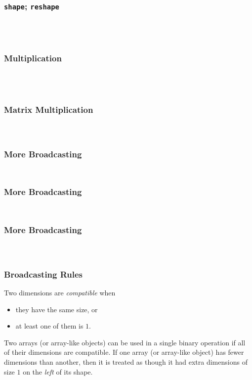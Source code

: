 \documentclass{beamer}
\begin{document}
\begin{frame}[fragile]
  \frametitle{\texttt{shape}; \texttt{reshape}}
  \inputminted[firstline=1,lastline=2]{pycon}{code/shape.txt}
  \codepause
  \inputminted[firstline=3,lastline=4]{pycon}{code/shape.txt}
  \codepause
  \inputminted[firstline=5,lastline=9]{pycon}{code/shape.txt}
  \codepause
  \inputminted[firstline=10,lastline=11]{pycon}{code/shape.txt}
\end{frame}

\begin{frame}[fragile]
  \frametitle{Multiplication}
  \inputminted[firstline=1,lastline=3]{pycon}{code/matmul.txt}
  \codepause
  \inputminted[firstline=4,lastline=6]{pycon}{code/matmul.txt}
  \codepause
  \inputminted[firstline=7,lastline=7]{pycon}{code/matmul.txt}
  \codepause
  \inputminted[firstline=8,lastline=9]{pycon}{code/matmul.txt}
\end{frame}

\begin{frame}[fragile]
  \frametitle{Matrix Multiplication}
  \inputminted[firstline=10,lastline=12]{pycon}{code/matmul.txt}
  \codepause
  \inputminted[firstline=13,lastline=14]{pycon}{code/matmul.txt}
  \codepause
  \inputminted[firstline=15,lastline=16]{pycon}{code/matmul.txt}
\end{frame}

\begin{frame}[fragile]
  \frametitle{More Broadcasting}
  \inputminted[firstline=1,lastline=5]{pycon}{code/broadcasting.txt}
  \codepause
  \inputminted[firstline=6,lastline=10]{pycon}{code/broadcasting.txt}
\end{frame}

\begin{frame}[fragile]
  \frametitle{More Broadcasting}
  \inputminted[firstline=11,lastline=12]{pycon}{code/broadcasting.txt}
  \codepause
  \inputminted[firstline=13,lastline=17]{pycon}{code/broadcasting.txt}
\end{frame}

\begin{frame}[fragile]
  \frametitle{More Broadcasting}
  \inputminted[firstline=18,lastline=19]{pycon}{code/broadcasting.txt}
  \codepause
  \inputminted[firstline=20,lastline=20]{pycon}{code/broadcasting.txt}
  \codepause
  \inputminted[firstline=21,lastline=23]{pycon}{code/broadcasting.txt}
\end{frame}

\begin{frame}
  \frametitle{Broadcasting Rules}
  Two dimensions are \emph{compatible} when
  \pause
  \begin{itemize}
  \item they have the same size, or
    \pause
  \item at least one of them is \(1\).
  \end{itemize}
  \pause
  Two arrays (or array-like objects) can be used in a single binary operation if all of their dimensions are compatible.
  \pause
  If one array (or array-like object) has fewer dimensions than another, then it is treated as though it had extra dimensions of size \(1\) on the \emph{left} of its shape.
\end{frame}
\end{document}
